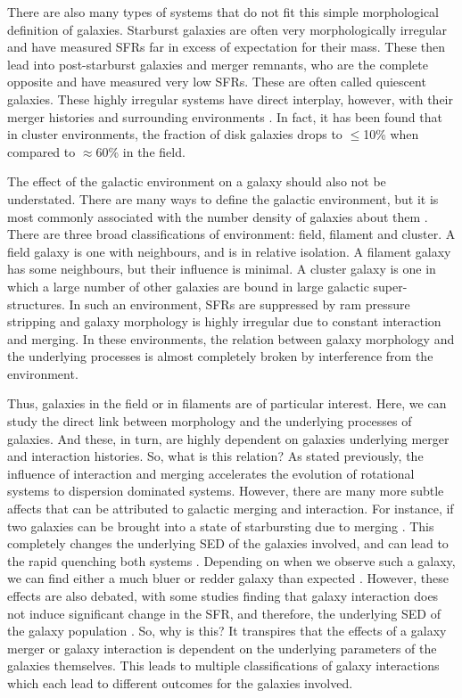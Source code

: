 There are also many types of systems that do not fit this simple morphological definition of galaxies. Starburst galaxies are often very morphologically irregular and have measured SFRs far in excess of expectation for their mass. These then lead into post-starburst galaxies and merger remnants, who are the complete opposite and have measured very low SFRs. These are often called quiescent galaxies. These highly irregular systems have direct interplay, however, with their merger histories and surrounding environments \citep{2018MNRAS.477.1708P, 2020MNRAS.493.3716H}. In fact, it has been found that in cluster environments, the fraction of disk galaxies drops to $\leq$10\% when compared to $\approx$60\% in the field.

The effect of the galactic environment on a galaxy should also not be understated. There are many ways to define the galactic environment, but it is most commonly associated with the number density of galaxies about them \citep{2003ApJ...585..694E, 2004ApJ...615L.101B}. There are three broad classifications of environment: field, filament and cluster. A field galaxy is one with neighbours, and is in relative isolation. A filament galaxy has some neighbours, but their influence is minimal. A cluster galaxy is one in which a large number of other galaxies are bound in large galactic super-structures. In such an environment, SFRs are suppressed \citep{2006MNRAS.373..469B} by ram pressure stripping and galaxy morphology is highly irregular due to constant interaction and merging. In these environments, the relation between galaxy morphology and the underlying processes is almost completely broken by interference from the environment.

Thus, galaxies in the field or in filaments are of particular interest. Here, we can study the direct link between morphology and the underlying processes of galaxies. And these, in turn, are highly dependent on galaxies underlying merger and interaction histories. So, what is this relation? As stated previously, the influence of interaction and merging accelerates the evolution of rotational systems to dispersion dominated systems. However, there are many more subtle affects that can be attributed to galactic merging and interaction. For instance, if two galaxies can be brought into a state of starbursting due to merging \citep{2008MNRAS.385L..38M}. This completely changes the underlying SED of the galaxies involved, and can lead to the rapid quenching both systems \citep{2018MNRAS.476.2591V, 2022MNRAS.517L..92E}. Depending on when we observe such a galaxy, we can find either a much bluer or redder galaxy than expected \citep{2007A&A...468...61D}. However, these effects are also debated, with some studies finding that galaxy interaction does not induce significant change in the SFR, and therefore, the underlying SED of the galaxy population \citep{2003A&A...405...31B}. So, why is this? It transpires that the effects of a galaxy merger or galaxy interaction is dependent on the underlying parameters of the galaxies themselves. This leads to multiple classifications of galaxy interactions which each lead to different outcomes for the galaxies involved. 

